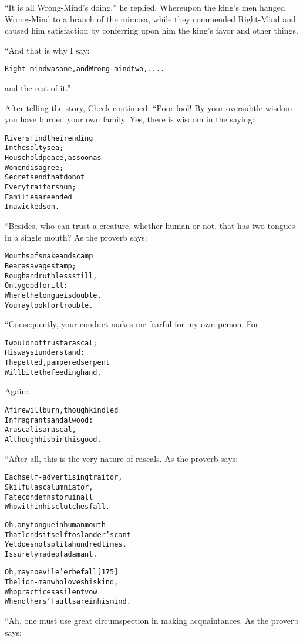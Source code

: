 \documentclass{article}
\renewenvironment{verbatim}{\begin{alltt}\normalfont\begin{centering}}{\end{centering}\end{alltt}}
\begin{document}
``It is all Wrong-Mind's doing,'' he replied. Whereupon the king's
men hanged Wrong-Mind to a branch of the mimosa, while they
commended Right-Mind and caused him satisfaction by conferring upon
him the king's favor and other things.

“And that is why I say:

\begin{verbatim}
Right-mind was one, and Wrong-mind two, ....
\end{verbatim}
and the rest of it.”

After telling the story, Cheek continued: “Poor fool! By your
oversubtle wisdom you have burned your own family. Yes, there is
wisdom in the saying:

\begin{verbatim}
Rivers find their ending
    In the salty sea;
Household peace, as soon as
    Women disagree;
Secrets end that do not
    Every traitor shun;
Families are ended
    In a wicked son.
\end{verbatim}
“Besides, who can trust a creature, whether human or not, that has
two tongues in a single mouth? As the proverb says:

\begin{verbatim}
Mouths of snake and scamp
Bear a savage stamp;
Rough and ruthless still,
Only good for ill:
Where the tongue is double,
You may look for trouble.
\end{verbatim}
“Consequently, your conduct makes me fearful for my own person.
For

\begin{verbatim}
I would not trust a rascal;
    His ways I understand:
The petted, pampered serpent
    Will bite the feeding hand.
\end{verbatim}
Again:

\begin{verbatim}
A fire will burn, though kindled
    In fragrant sandalwood:
A rascal is a rascal,
    Although his birth is good.
\end{verbatim}
“After all, this is the very nature of rascals. As the proverb
says:

\begin{verbatim}
Each self-advertising traitor,
Skilful as calumniator,
Fate condemns to ruin all
Who within his clutches fall.

Oh, any tongue in human mouth
    That lends itself to slander's cant
Yet does not split a hundred times,
    Is surely made of adamant.

Oh, may no evil e'er befall                             [175]
    The lion-man who loves his kind,
Who practices a silent vow
    When others' faults are in his mind.
\end{verbatim}
“Ah, one must use great circumspection in making acquaintances. As
the proverb says:
\end{document}
